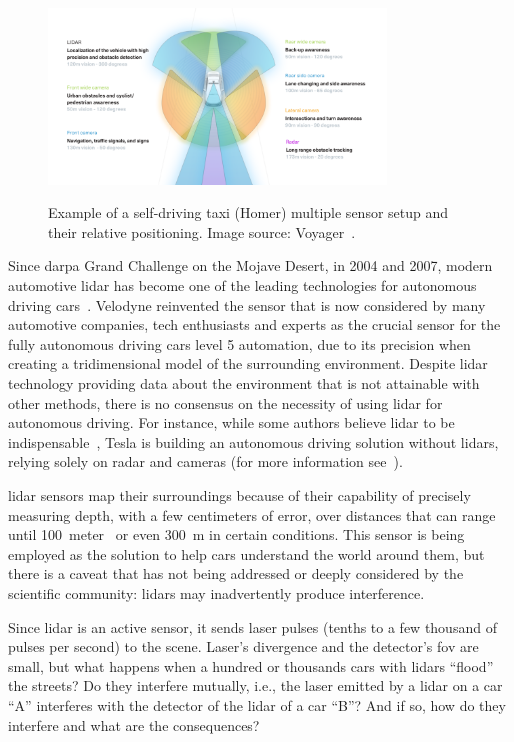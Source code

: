 \begin{figure}
	\centering
	\includegraphics[width=0.8\textwidth]{img/sensor_fusion/homer_setup.png}
	\label{fig:introduction:homer-setup}
	\caption{Example of a self-driving taxi (Homer) multiple sensor setup and their relative positioning. Image source: Voyager~\cite{Cameron}.}
\end{figure}

Since \ac{darpa} Grand Challenge on the Mojave Desert, in 2004 and 2007, modern automotive \ac{lidar} has become one of the leading technologies for autonomous driving cars~\cite{Bezemek2017}. Velodyne reinvented the sensor that is now considered by many automotive companies, tech enthusiasts and experts as the crucial sensor for the fully autonomous driving cars level 5 automation, due to its precision when creating a tridimensional  model of the surrounding environment. Despite \ac{lidar} technology providing data about the environment that is not attainable with other methods, there is no consensus on the necessity of using \ac{lidar} for autonomous driving. For instance, while some authors believe \ac{lidar} to be indispensable~\cite{Bimbraw2015, Hecht2018, Sullivan2016}, Tesla is building an autonomous driving solution without \acp{lidar}, relying solely on \ac{radar} and cameras (for more information see~\cite{Bimbraw2015, Hecht2018}).


\ac{lidar} sensors map their surroundings because of their capability of precisely measuring depth, with a few centimeters of error, over distances that can range until \SI{100}{meter}~\cite{vlp16, Sullivan2016} or even \SI{300}{\meter} in certain conditions. This sensor is being employed as the solution to help cars understand the world around them, but there is a caveat that has not being addressed or deeply considered by the scientific community: \acp{lidar} may inadvertently produce interference.

Since \ac{lidar} is an active sensor, it sends laser pulses (tenths to a few thousand of pulses per second) to the scene. Laser's divergence and the detector's \ac{fov} are small, but what happens when a hundred or thousands cars with \acp{lidar} ``flood'' the streets? Do they interfere mutually, i.e., the laser emitted by a \ac{lidar} on a car ``A'' interferes with the detector of the \ac{lidar} of a car ``B''? And if so, how do they interfere and what are the consequences? 

